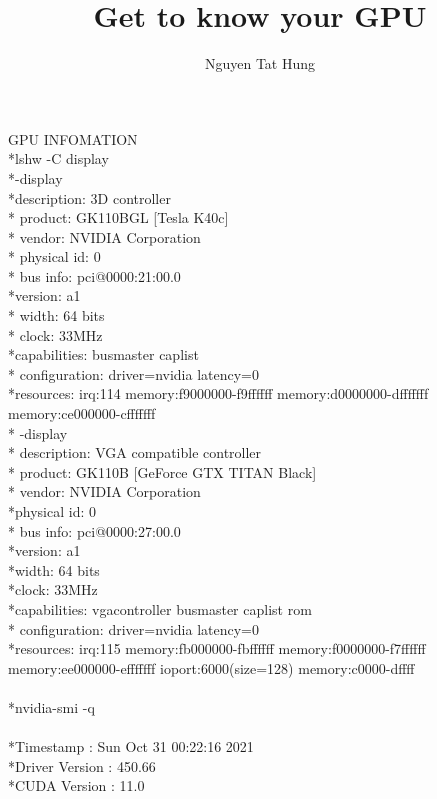\documentclass{article}
\title{Get to know your GPU}
\author{Nguyen Tat Hung}
\begin{document}
   \maketitle
   GPU INFOMATION
   \\*lshw -C display
   \\*-display                 
       \\*description: 3D controller
      \\* product: GK110BGL [Tesla K40c]
      \\* vendor: NVIDIA Corporation
      \\* physical id: 0
      \\* bus info: pci@0000:21:00.0
       \\*version: a1
      \\* width: 64 bits
      \\* clock: 33MHz
       \\*capabilities: busmaster caplist
      \\* configuration: driver=nvidia latency=0
       \\*resources: irq:114 memory:f9000000-f9ffffff memory:d0000000-dfffffff memory:ce000000-cfffffff
 \\* -display
      \\* description: VGA compatible controller
      \\* product: GK110B [GeForce GTX TITAN Black]
      \\* vendor: NVIDIA Corporation
       \\*physical id: 0
      \\* bus info: pci@0000:27:00.0
       \\*version: a1
       \\*width: 64 bits
       \\*clock: 33MHz
       \\*capabilities: vgacontroller busmaster caplist rom
      \\* configuration: driver=nvidia latency=0
       \\*resources: irq:115 memory:fb000000-fbffffff memory:f0000000-f7ffffff memory:ee000000-efffffff ioport:6000(size=128) memory:c0000-dffff
       \\
       \\*nvidia-smi -q
       \\
 \\*Timestamp                                 : Sun Oct 31 00:22:16 2021
 \\*Driver Version                            : 450.66
 \\*CUDA Version                              : 11.0
\end{document}
